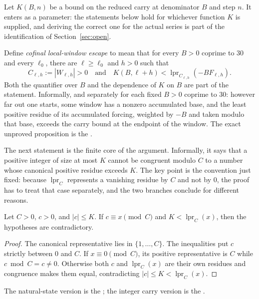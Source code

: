 \documentclass[11pt]{article}
\begin{document}
Let $K(B,n)$ be a bound on the reduced carry at denominator $B$ and step $n$.
It enters as a parameter: the statements below hold for whichever function $K$
is supplied, and deriving the correct one for the actual series is part of the
identification of Section~\ref{sec:open}.

Define
\emph{cofinal local-window escape} to mean that for every $B>0$ coprime to
$30$ and every $\ell_0$, there are $\ell\ge\ell_0$ and $h>0$ such that
\[
 C_{\ell,h}:=|W_{\ell,h}|>0
 \quad\text{and}\quad
 K(B,\ell+h)<
 \operatorname{lpr}_{C_{\ell,h}}(-BF_{\ell,h}).
\tag{E}\label{eq:escape}
\]
Both the quantifier over $B$ and the dependence of $K$ on $B$ are part of the
statement.  Informally, and separately for each fixed $B>0$ coprime to $30$:
however far out one starts, some window has a nonzero accumulated base, and
the least positive residue of its accumulated forcing, weighted by $-B$ and
taken modulo that base, exceeds the carry bound at the endpoint of the window.
The exact unproved proposition is the
.

The next statement is the finite core of the argument.  Informally, it says
that a positive integer of size at most $K$ cannot be congruent modulo $C$ to a
number whose canonical positive residue exceeds $K$.  The key point is the
convention just fixed: because $\operatorname{lpr}_C$ represents a vanishing
residue by $C$ and not by $0$, the proof has to treat that case separately, and
the two branches conclude for different reasons.

\begin{theorem}\label{res:consumer}
Let $C>0$, $c>0$, and $|c|\le K$.  If
$c\equiv x\pmod C$ and $K<\operatorname{lpr}_C(x)$, then the hypotheses are
contradictory.
\end{theorem}

\begin{proof}
The canonical representative lies in $\{1,\ldots,C\}$.  The inequalities put
$c$ strictly between $0$ and $C$.  If $x\equiv0\pmod C$, its positive
representative is $C$ while $c\bmod C=c\ne0$.  Otherwise both $c$ and
$\operatorname{lpr}_C(x)$ are their own residues and congruence makes them
equal, contradicting $|c|\le K<\operatorname{lpr}_C(x)$.
\end{proof}

\noindent The natural-state version is the
; the integer carry version is the
.
\end{document}
